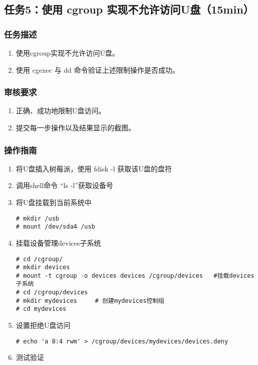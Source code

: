 \documentclass{article}
\begin{document}
\newpage
\subsection{任务5：使用 cgroup 实现不允许访问U盘（15min）}

\subsubsection{任务描述}
\begin{enumerate}
    \item 使用cgroup实现不允许访问U盘。
    \item 使用 cgexec 与 dd 命令验证上述限制操作是否成功。
\end{enumerate}

\subsubsection{审核要求}
\begin{enumerate}
    \item 正确、成功地限制U盘访问。
    \item 提交每一步操作以及结果显示的截图。
\end{enumerate}

\subsubsection{操作指南}
\begin{enumerate}
    \item 将U盘插入树莓派，使用 fdisk -l 获取该U盘的盘符
    \item 调用shell命令 “ls -l”获取设备号
    \item 将U盘挂载到当前系统中
\begin{lstlisting}
# mkdir /usb
# mount /dev/sda4 /usb
\end{lstlisting}
    \item 挂载设备管理devices子系统
\begin{lstlisting}
# cd /cgroup/
# mkdir devices
# mount -t cgroup -o devices devices /cgroup/devices   #挂载devices子系统
# cd /cgroup/devices
# mkdir mydevices     # 创建mydevices控制组
# cd mydevices
\end{lstlisting}
    \item 设置拒绝U盘访问
\begin{lstlisting}
# echo 'a 8:4 rwm' > /cgroup/devices/mydevices/devices.deny
\end{lstlisting}
    \item 测试验证
\end{enumerate}
\end{document}
